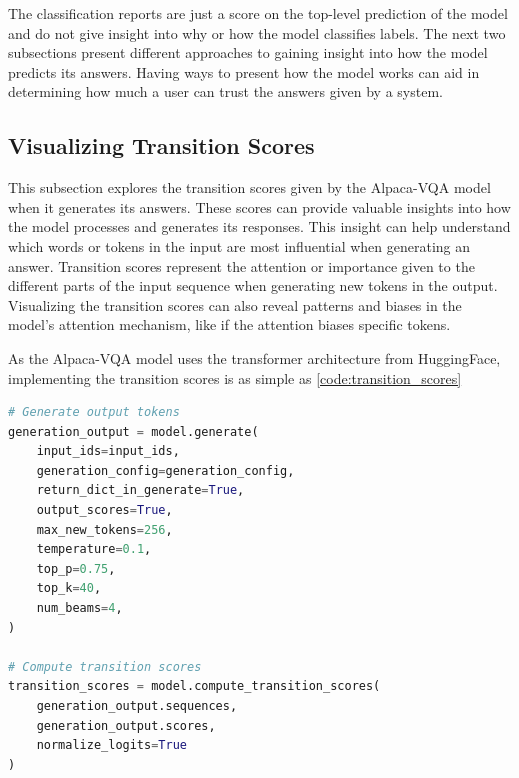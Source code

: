         The classification reports are just a score on the top-level prediction of the model and do not give insight into why or how the model classifies labels. The next two subsections present different approaches to gaining insight into how the model predicts its answers. Having ways to present how the model works can aid in determining how much a user can trust the answers given by a system. 
    
    
    \subsection{Visualizing Transition Scores}
    \label{sec4:vis_transtion_scores}

   
    This subsection explores the transition scores given by the Alpaca-VQA model when it generates its answers. These scores can provide valuable insights into how the model processes and generates its responses. This insight can help understand which words or tokens in the input are most influential when generating an answer. 
    Transition scores represent the attention or importance given to the different parts of the input sequence when generating new tokens in the output. Visualizing the transition scores can also reveal patterns and biases in the model's attention mechanism, like if the attention biases specific tokens.
    
    As the Alpaca-VQA model uses the transformer architecture from HuggingFace, implementing the transition scores is as simple as \autoref{code:transition_scores}

\begin{lstlisting}[language=Python, caption=Example of how to generate transition scores, label={code:transition_scores}]
# Generate output tokens
generation_output = model.generate(
    input_ids=input_ids,
    generation_config=generation_config,
    return_dict_in_generate=True,
    output_scores=True,
    max_new_tokens=256,
    temperature=0.1,
    top_p=0.75,
    top_k=40,
    num_beams=4,
)

# Compute transition scores
transition_scores = model.compute_transition_scores(
    generation_output.sequences, 
    generation_output.scores, 
    normalize_logits=True
)
\end{lstlisting}

